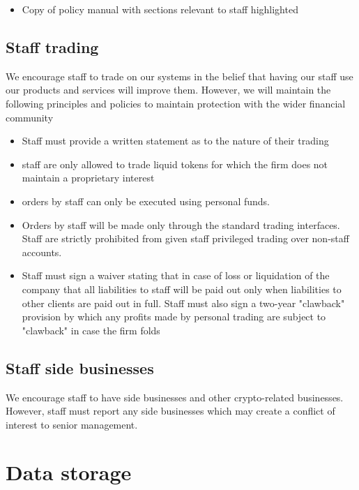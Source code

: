 \begin{itemize}
  \item Copy of policy manual with sections relevant to staff
    highlighted
\end{itemize}

\subsection{Staff trading}

We encourage staff to trade on our systems in the belief that having
our staff use our products and services will improve them.
However, we will maintain the following principles and policies to
maintain protection with the wider financial community

\begin{itemize}
 \item Staff must provide a written statement as to the nature of
   their trading
  \item staff are only allowed to trade liquid tokens for which the
    firm does not maintain a proprietary interest
  \item orders by staff can only be executed using personal funds.
  \item Orders by staff will be made only through the standard trading
    interfaces.  Staff are strictly prohibited from given staff
    privileged trading over non-staff accounts.
  \item Staff must sign a waiver stating that in case of loss or
    liquidation of the company that all liabilities to staff will be
    paid out only when liabilities to other clients are paid out in
    full.  Staff must also sign a two-year "clawback" provision by
    which any profits made by personal trading are subject to
    "clawback" in case the firm folds
\end{itemize}

\subsection{Staff side businesses}
We encourage staff to have side businesses and other crypto-related
businesses.  However, staff must report any side businesses which may
create a conflict of interest to senior management.


\section{Data storage}
